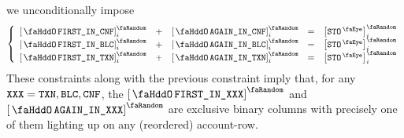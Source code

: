 \begin{description}
		we unconditionally impose
		\[
			\left\{ \begin{array}{lclcl}
				\stoFirstInConflation  _{i} & + & \stoAgainInConflation  _{i} & = & \order{\peekStorage} _{i} \\
				\stoFirstInBlock       _{i} & + & \stoAgainInBlock       _{i} & = & \order{\peekStorage} _{i} \\
				\stoFirstInTransaction _{i} & + & \stoAgainInTransaction _{i} & = & \order{\peekStorage} _{i} \\
			\end{array} \right.
		\]
		\saNote{} These constraints along with the previous constraint imply that, for any $\texttt{XXX} = \texttt{TXN}, \texttt{BLC}, \texttt{CNF}$, the 
		$\stoFirstInXxx$ and $\stoAgainInXxx$ are exclusive binary columns with precisely one of them lighting up on any (reordered) account-row.
\end{description}

